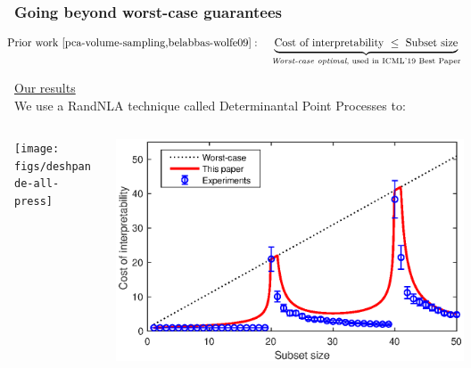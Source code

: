 \documentclass[10pt,handout]{beamer}
\begin{document}
\begin{frame}
\begin{columns}
\begin{column}{0.27\textwidth}
\begin{center}
    \end{center}
  \end{column}
\end{columns}



\end{frame}


\begin{frame}
  \frametitle{Going beyond worst-case guarantees}
  \begin{align*}
\hspace{-3mm}\text{Prior work \cite{pca-volume-sampling,belabbas-wolfe09}}:\quad
    \underbrace{\text{Cost of interpretability}\ 
\leq\  \text{Subset size}}_{\text{\textit{Worst-case optimal}, used in ICML'19
    Best Paper}} %
  \end{align*}  
\vspace{4mm}

\underline{Our results}\\
We use a RandNLA technique called Determinantal Point Processes to:
  \vspace{5mm}

 \begin{columns}
   \hspace{-3mm}\begin{column}{.48\textwidth}
     \centering
{}

\texttt{[image: figs/deshpande-all-press]}
\end{column}
\begin{column}{.48\textwidth}

  \includegraphics[width=1.05\textwidth]{figs/nystrom-bounds-press}
\end{column}
\end{columns}


\end{frame}
\end{document}
